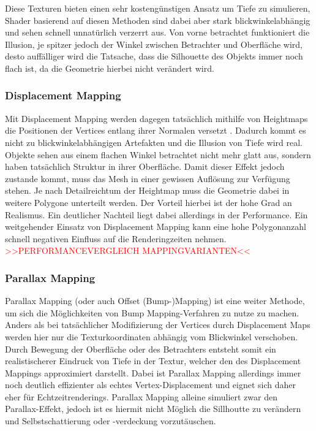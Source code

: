 Diese Texturen bieten einen sehr kostengünstigen
Ansatz um Tiefe zu simulieren, Shader basierend auf diesen Methoden sind dabei aber stark 
blickwinkelabhängig und sehen schnell unnatürlich verzerrt aus.
Von vorne betrachtet funktioniert die Illusion, je spitzer jedoch der Winkel zwischen Betrachter und
Oberfläche wird, desto auffälliger wird die Tatsache, dass die Silhouette des Objekts immer 
noch flach ist, da die Geometrie hierbei nicht verändert wird. 

\subsubsection{Displacement Mapping}
Mit Displacement Mapping werden dagegen tatsächlich mithilfe von Heightmaps die Positionen 
der Vertices entlang ihrer Normalen versetzt \parencite{Cook1984,Cook1987}. Dadurch kommt es nicht zu blickwinkelabhängigen Artefakten 
und die Illusion von Tiefe wird real. Objekte sehen aus einem flachen Winkel betrachtet nicht mehr 
glatt aus, sondern haben tatsächlich Struktur in ihrer Oberfläche. Damit dieser Effekt jedoch zustande kommt, 
muss das Mesh in einer gewissen Auflösung zur Verfügung stehen. Je nach Detailreichtum der Heightmap 
muss die Geometrie dabei in weitere Polygone unterteilt werden. Der Vorteil hierbei ist der hohe 
Grad an Realismus. Ein deutlicher Nachteil liegt dabei allerdings in der Performance. 
Ein weitgehender Einsatz von Displacement Mapping kann eine hohe Polygonanzahl schnell 
negativen Einfluss auf die Renderingzeiten nehmen.
\textcolor{red}{>>PERFORMANCEVERGLEICH MAPPINGVARIANTEN<<}

\subsubsection{Parallax Mapping}

Parallax Mapping (oder auch Offset (Bump-)Mapping) ist eine weiter Methode, um sich die Möglichkeiten von
Bump Mapping-Verfahren zu nutze zu machen. Anders als bei tatsächlicher Modifizierung der Vertices 
durch Displacement Maps werden hier nur die Texturkoordinaten abhängig vom Blickwinkel verschoben. \parencite{Kaneko2001, Welsh2004}
Durch Bewegung der Oberfläche oder des Betrachters entsteht somit ein realistischerer Eindruck 
von Tiefe in der Textur, welcher den des Displacement Mappings approximiert darstellt. 
Dabei ist Parallax Mapping allerdings immer noch deutlich effizienter als echtes Vertex-Displacement
und eignet sich daher eher für Echtzeitrenderings. Parallax Mapping alleine simuliert zwar den 
Parallax-Effekt, jedoch ist es hiermit nicht Möglich die Sillhoutte zu verändern und 
Selbstschattierung oder -verdeckung vorzutäuschen. 


